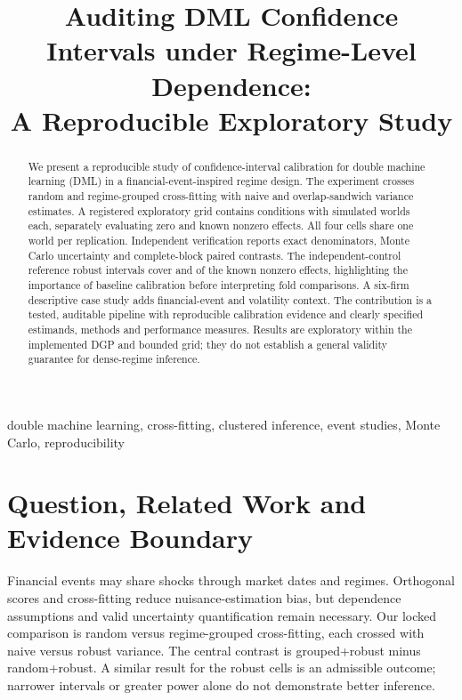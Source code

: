 \documentclass[conference]{IEEEtran}
\begin{document}
\title{Auditing DML Confidence Intervals under Regime-Level Dependence:\\A Reproducible Exploratory Study}
\author{
}
\maketitle
\begin{abstract}
We present a reproducible study of confidence-interval calibration for double machine learning (DML) in a financial-event-inspired regime design. The experiment crosses random and regime-grouped cross-fitting with naive and overlap-sandwich variance estimates. A registered exploratory grid contains \NumScenarios{} conditions with \Reps{} simulated worlds each, separately evaluating zero and known nonzero effects. All four cells share one world per replication. Independent verification reports exact denominators, Monte Carlo uncertainty and complete-block paired contrasts. The independent-control reference robust intervals cover \IndependentRandomCoverage{} and \IndependentGroupedCoverage{} of the known nonzero effects, highlighting the importance of baseline calibration before interpreting fold comparisons. A six-firm descriptive case study adds financial-event and volatility context. The contribution is a tested, auditable pipeline with reproducible calibration evidence and clearly specified estimands, methods and performance measures. Results are exploratory within the implemented DGP and bounded grid; they do not establish a general validity guarantee for dense-regime inference.
\end{abstract}
\begin{IEEEkeywords}
double machine learning, cross-fitting, clustered inference, event studies, Monte Carlo, reproducibility
\end{IEEEkeywords}

\section{Question, Related Work and Evidence Boundary}
Financial events may share shocks through market dates and regimes. Orthogonal scores and cross-fitting reduce nuisance-estimation bias, but dependence assumptions and valid uncertainty quantification remain necessary. Our locked comparison is random versus regime-grouped cross-fitting, each crossed with naive versus robust variance. The central contrast is grouped+robust minus random+robust. A similar result for the robust cells is an admissible outcome; narrower intervals or greater power alone do not demonstrate better inference.
\end{document}
